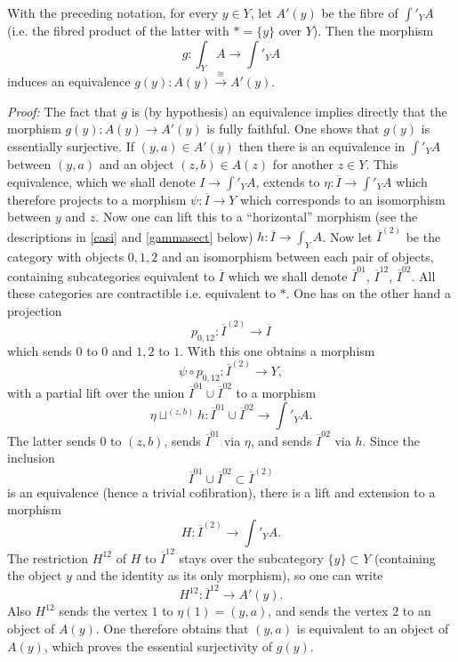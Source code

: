 \begin{lemma}
\label{inchange}
With the preceding notation, for every $y\in Y$, let $A'(y)$ be the fibre of
$\int '_YA$ (i.e. the fibred product of the latter with $\ast = \{ y\}$
over $Y$). Then the morphism
$$
g:\int _YA\rightarrow \int '_YA
$$
induces an equivalence $g(y): A(y)\stackrel{\cong}{\rightarrow} A'(y)$.
\end{lemma}
{\em Proof:}
The fact that $g$ is (by hypothesis) an equivalence implies
directly that the morphism $g(y):A(y)\rightarrow A'(y)$ is fully
faithful. One shows that $g(y)$ is essentially surjective.
If $(y,a)\in A'(y)$ then there is an equivalence in $\int '_YA$ between
$(y,a)$ and an object $(z,b)\in A(z)$ for another $z\in Y$. This equivalence,
which we shall denote $I\rightarrow \int '_YA$, extends to $\eta :
\overline{I}\rightarrow \int '_YA$ which therefore projects to a morphism
$\psi :
\overline{I}\rightarrow Y$ which corresponds to an isomorphism between $y$ and $z$.
Now one can lift this to a ``horizontal'' morphism (see the descriptions
in \ref{casi} and \ref{gammasect} below)
$h:\overline{I}\rightarrow \int _YA$. Now let $\overline{I}^{(2)}$ be the
category with objects $0,1,2$ and an isomorphism between each pair
of objects,
containing subcategories equivalent to $\overline{I}$ which we shall denote
$\overline{I}^{01}$, $\overline{I}^{12}$, $\overline{I}^{02}$. All these
categories are contractible i.e. equivalent to $\ast$. One has on the other
hand a projection
$$
p_{0,12}: \overline{I}^{(2)}\rightarrow \overline{I}
$$
which sends $0$ to $0$ and $1,2$ to $1$. With this one obtains a morphism
$$
\psi \circ p_{0,12}: \overline{I}^{(2)}\rightarrow Y,
$$
with a partial lift over the union $\overline{I}^{01}\cup
\overline{I}^{02}$ to a morphism
$$
\eta \sqcup ^{(z,b)}h: \overline{I}^{01}\cup
\overline{I}^{02}\rightarrow \int '_YA.
$$
The latter sends $0$ to $(z,b)$, sends $\overline{I}^{01}$ via $\eta$, and
sends $\overline{I}^{02}$ via $h$. Since the inclusion
$$
\overline{I}^{01}\cup
\overline{I}^{02}\subset
\overline{I}^{(2)}
$$
is an equivalence (hence a trivial cofibration), there is a lift
and extension to a morphism
$$
H: \overline{I}^{(2)}\rightarrow \int '_YA.
$$
The restriction $H^{12}$ of $H$ to $\overline{I}^{12}$ stays over the
subcategory $\{ y\} \subset Y$ (containing the object $y$ and the identity
as its only morphism), so one can write
$$
H^{12}: \overline{I}^{12}\rightarrow A'(y).
$$
Also $H^{12}$ sends
the vertex $1$ to $\eta (1)= (y,a)$, and sends the vertex $2$ to an object of
$A(y)$. One therefore obtains that $(y,a)$ is equivalent to an object of
$A(y)$, which proves the essential surjectivity of $g(y)$.
\eop

